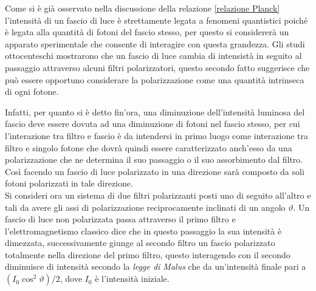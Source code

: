 Come si è già osservato nella discussione della relazione \eqref{relazione Planck} l'intensità di un fascio di luce è strettamente legata a fenomeni quantistici poiché è legata alla quantità di fotoni del fascio stesso, per questo si considererà un apparato sperimentale che consente di interagire con questa grandezza. Gli studi ottocenteschi mostrarono che un fascio di luce cambia di intensistà in seguito al passaggio attraverso alcuni filtri polarizzatori, questo secondo fatto suggerisce che può essere opportuno considerare la polarizzazione come una quantità intrinseca di ogni fotone.
\begin{figure}[H]
    \centering
\end{figure}
 Infatti, per quanto si è detto fin'ora, una diminuzione dell'intensità luminosa del fascio deve essere dovuta ad una diminuzione di fotoni nel fascio stesso, per cui l'interazione tra filtro e fascio è da intendersi in primo luogo come interazione tra filtro e singolo fotone che dovrà quindi essere caratterizzato anch'esso da una polarizzazione che ne determina il suo passaggio o il suo assorbimento dal filtro. Così facendo un fascio di luce polarizzato in una direzione sarà composto da soli fotoni polarizzati in tale direzione.\\
Si consideri ora un sistema di due filtri polarizzanti posti uno di seguito all'altro e tali da avere gli assi di polarizzazione reciprocamente inclinati di un angolo $\vartheta$. Un fascio di luce non polarizzata passa attraverso il primo filtro e l'elettromagnetismo classico dice che in questo passaggio la sua intensità è dimezzata, successivamente giunge al secondo filtro un fascio polarizzato totalmente nella direzione del primo filtro, questo interagendo con il secondo diminuisce di intensità secondo la \emph{legge di Malus} che da un'intensità finale pari a $(I_0 \cos^2\vartheta)/2$, dove $I_0$ è l'intensità iniziale.
\begin{figure}[H]
    \centering
\end{figure}
